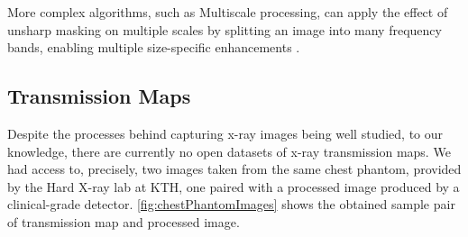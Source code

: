 \documentclass[nomenclature, english, bibtex]{kththesis}
\numberwithin{listing}{chapter}
\begin{document}
More complex algorithms, such as Multiscale processing, can apply the effect of unsharp masking on multiple scales
by splitting an image into many frequency bands, enabling multiple size-specific enhancements \cite[p.~156]{Prokop2003}.

\subsection{Transmission Maps}
\label{sec:transmissionMaps}

Despite the processes behind capturing x-ray images being well studied, to our knowledge, there are currently no open datasets of x-ray
transmission maps. We had access to, precisely, two images taken from the same chest phantom, provided by the Hard X-ray lab
at KTH, one paired with a processed image produced by a clinical-grade detector. \autoref{fig:chestPhantomImages} shows the obtained sample
pair of transmission map and processed image.
\end{document}

